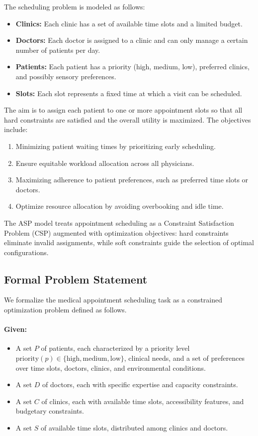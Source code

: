 \documentclass{tlp}
\begin{document}
The scheduling problem is modeled as follows:
\begin{itemize}
    \item \textbf{Clinics:} Each clinic has a set of available time slots and a limited budget.
    \item \textbf{Doctors:} Each doctor is assigned to a clinic and can only manage a certain number of patients per day.
    \item \textbf{Patients:} Each patient has a priority (high, medium, low), preferred clinics, and possibly sensory preferences.
    \item \textbf{Slots:} Each slot represents a fixed time at which a visit can be scheduled.
\end{itemize}
The aim is to assign each patient to one or more appointment slots so that all hard constraints are satisfied and the overall utility is maximized. The objectives include:
\begin{enumerate}
    \item Minimizing patient waiting times by prioritizing early scheduling.
    \item Ensure equitable workload allocation across all physicians.
    \item Maximizing adherence to patient preferences, such as preferred time slots or doctors.
    \item Optimize resource allocation by avoiding overbooking and idle time.
\end{enumerate}

The ASP model treats appointment scheduling as a Constraint Satisfaction Problem (CSP) augmented with optimization objectives: hard constraints eliminate invalid assignments, while soft constraints guide the selection of optimal configurations.

\subsection{Formal Problem Statement}
\label{sec:formalproblem}

We formalize the medical appointment scheduling task as a constrained optimization problem defined as follows.

\paragraph{Given:}
\begin{itemize}
    \item A set $P$ of patients, each characterized by a priority level $\text{priority}(p) \in \{\text{high}, \text{medium}, \text{low}\}$, clinical needs, and a set of preferences over time slots, doctors, clinics, and environmental conditions.
    \item A set $D$ of doctors, each with specific expertise and capacity constraints.
    \item A set $C$ of clinics, each with available time slots, accessibility features, and budgetary constraints.
    \item A set $S$ of available time slots, distributed among clinics and doctors.
\end{itemize}
\end{document}
